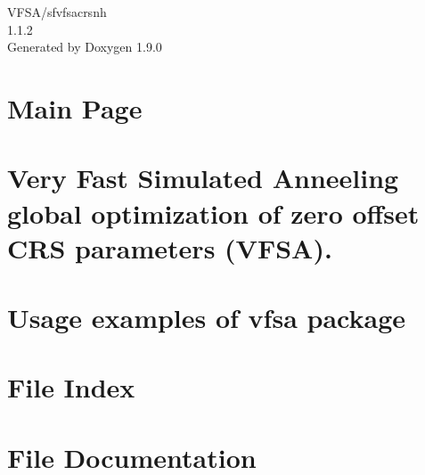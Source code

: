 \let\mypdfximage\pdfximage\def\pdfximage{\immediate\mypdfximage}\documentclass[twoside]{book}
\newcommand{\+}{\discretionary{\mbox{\scriptsize$\hookleftarrow$}}{}{}}
\newcommand{\clearemptydoublepage}{%
  \newpage{\pagestyle{empty}\cleardoublepage}%
}
\begin{document}
\raggedbottom

\hypersetup{pageanchor=false,
             bookmarksnumbered=true,
             pdfencoding=unicode
            }
\begin{titlepage}
\vspace*{7cm}
\begin{center}%
{\Large VFSA/sfvfsacrsnh \\[1ex]\large 1.\+1.\+2 }\\
\vspace*{1cm}
{\large Generated by Doxygen 1.9.0}\\
\end{center}
\end{titlepage}
\clearemptydoublepage
{}
\tableofcontents
\clearemptydoublepage
{}
\hypersetup{pageanchor=true}

\chapter{Main Page}
\label{index}\hypertarget{index}{}
\chapter{Very Fast Simulated Anneeling global optimization of zero offset CRS parameters (VFSA).}
\label{md__home_dirack_madagascar-3_80_user_vfsa__r_e_a_d_m_e}

\chapter{Usage examples of vfsa package}
\label{md__home_dirack_madagascar-3_80_user_vfsa_usage_examples__r_e_a_d_m_e}

\chapter{File Index}

\chapter{File Documentation}



\backmatter
\newpage
{}
\clearemptydoublepage
{}
\printindex
\end{document}

